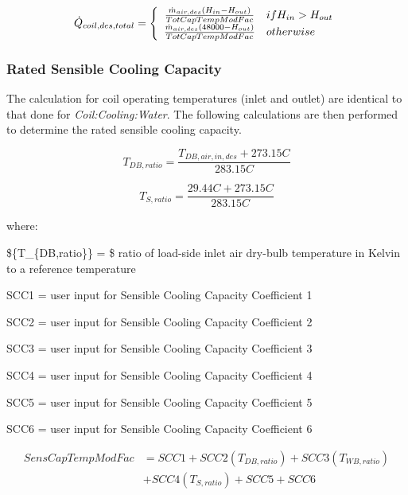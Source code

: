 \begin{equation}
  \dot{Q}_{coil,des,total}   = \left\{
                                  \begin{array}{cl}
                                    \frac{\dot{m}_{air,des}\PB{H_{in}-H_{out}}}{TotCapTempModFac}  & if H_{in}>H_{out} \\
                                    \frac{\dot{m}_{air,des}\PB{48000 -H_{out}}}{TotCapTempModFac}  & otherwise
                                  \end{array}
                                \right.
\end{equation}

\subsubsection{Rated Sensible Cooling Capacity}\label{rated-sensible-cooling-capacity}

The calculation for coil operating temperatures (inlet and outlet) are identical to that done for \emph{Coil:Cooling:Water}. The following calculations are then performed to determine the rated sensible cooling capacity.

\begin{equation}
  T_{DB,ratio} = \frac{T_{DB,air,in,des}+273.15C}{283.15C}
\end{equation}

\begin{equation}
  T_{S,ratio} = \frac{29.44C+273.15C}{283.15C}
\end{equation}

where:

\$\{T\_\{DB,ratio\}\} = \$ ratio of load-side inlet air dry-bulb temperature in Kelvin to a reference temperature

SCC1 = user input for Sensible Cooling Capacity Coefficient 1

SCC2 = user input for Sensible Cooling Capacity Coefficient 2

SCC3 = user input for Sensible Cooling Capacity Coefficient 3

SCC4 = user input for Sensible Cooling Capacity Coefficient 4

SCC5 = user input for Sensible Cooling Capacity Coefficient 5

SCC6 = user input for Sensible Cooling Capacity Coefficient 6

\begin{equation}
  \begin{array}{rl}
    SensCapTempModFac &= SCC1 + SCC2\left( {{T_{DB,ratio}}} \right) + SCC3\left( {{T_{WB,ratio}}} \right) \\
                      &+ SCC4\left( {{T_{S,ratio}}} \right) + SCC5 + SCC6
  \end{array}
\end{equation}

